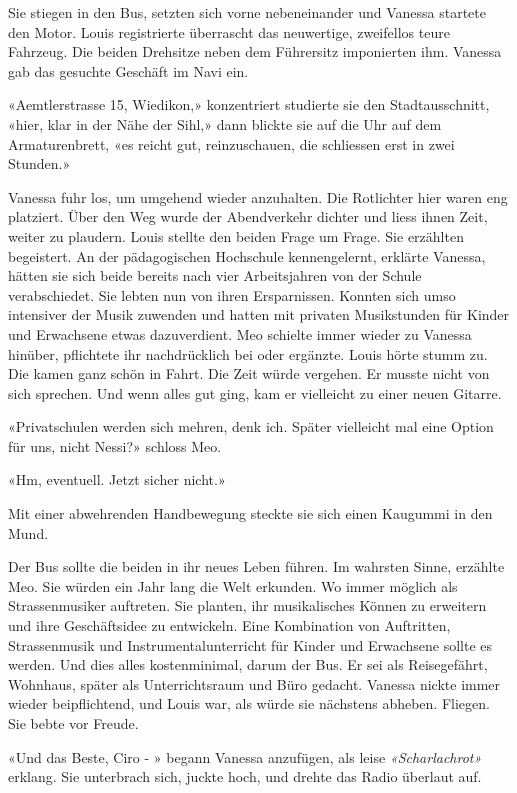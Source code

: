 Sie stiegen in den Bus, setzten sich vorne nebeneinander und Vanessa
startete den Motor. Louis registrierte überrascht das neuwertige,
zweifellos teure Fahrzeug. Die beiden Drehsitze neben dem Führersitz imponierten ihm. 
Vanessa gab das gesuchte Geschäft im Navi ein.

«Aemtlerstrasse 15, Wiedikon,» konzentriert studierte sie den
Stadtausschnitt, «hier, klar in der Nähe der Sihl,» dann
blickte sie auf die Uhr auf dem Armaturenbrett, «es reicht gut,
reinzuschauen, die schliessen erst in zwei Stunden.»

Vanessa fuhr los, um umgehend wieder anzuhalten. Die Rotlichter hier waren eng platziert.
Über den Weg wurde der Abendverkehr dichter und liess ihnen Zeit,
weiter zu plaudern. Louis stellte den beiden Frage um Frage. Sie
erzählten begeistert.
An der pädagogischen Hochschule kennengelernt, erklärte Vanessa, hätten
sie sich beide bereits nach vier Arbeitsjahren von der Schule
verabschiedet. Sie lebten nun von ihren Ersparnissen. Konnten sich umso
intensiver der Musik zuwenden und hatten mit privaten Musikstunden für
Kinder und Erwachsene etwas dazuverdient.
Meo schielte immer wieder zu Vanessa hinüber, pflichtete ihr
nachdrücklich bei oder ergänzte.
Louis hörte stumm zu. Die kamen ganz schön in Fahrt. Die Zeit würde
vergehen. Er musste nicht von sich sprechen. Und wenn alles gut ging,
kam er vielleicht zu einer neuen Gitarre.

«Privatschulen werden sich mehren, denk ich. Später vielleicht mal eine
Option für uns, nicht Nessi?» schloss Meo.

«Hm, eventuell. Jetzt sicher nicht.»

Mit einer abwehrenden Handbewegung steckte sie sich einen Kaugummi in
den Mund.

Der Bus sollte die beiden in ihr neues Leben führen. Im wahrsten Sinne, erzählte 
Meo. Sie würden ein Jahr lang die Welt erkunden. Wo immer
möglich als Strassenmusiker auftreten. Sie planten, ihr musikalisches
Können zu erweitern und ihre Geschäftsidee zu entwickeln. Eine
Kombination von Auftritten, Strassenmusik und Instrumentalunterricht für
Kinder und Erwachsene sollte es werden. Und dies alles kostenminimal,
darum der Bus. Er sei als Reisegefährt, Wohnhaus, später als
Unterrichtsraum und Büro gedacht. Vanessa nickte immer wieder
beipflichtend, und Louis war, als würde sie nächstens abheben. Fliegen.
Sie bebte vor Freude.

«Und das Beste, Ciro - » begann Vanessa anzufügen, als leise
\emph{«Scharlachrot»} erklang. Sie unterbrach sich, juckte hoch, und
drehte das Radio überlaut auf.

